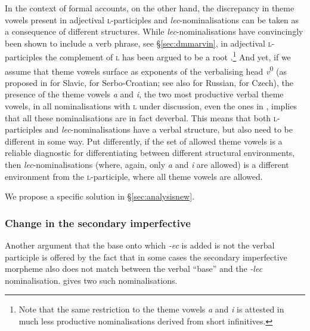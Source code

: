 \documentclass[output=paper,colorlinks,citecolor=brown]{langscibook}
\begin{document}
In the context of formal accounts, on the other hand, the discrepancy in theme vowels present in adjectival \textsc{l}-participles and \textit{lec}-nominalisations can be taken as a consequence of different structures. While \textit{lec}-nominalisations have convincingly been shown to include a verb phrase, see \S \ref{sec:dmmarvin}, in adjectival \textsc{l}-participles the complement of  \textsc{l} has been argued to be a root \citep{simonovicMismas2022}.\footnote{Note that the same restriction to the theme vowels \textit{a} and \textit{i} is attested in much less productive nominalisations derived from short infinitives.}  And yet, if we assume that theme vowels surface as exponents of the verbalising head \textit{v}\textsuperscript{0} (as proposed in \citealt{Quaglia2022} for Slavic, \citealt{MilosArsen2022} for Serbo-Croatian; see also \citealt{Svenonius2004a} for Russian, \citealt{sim+:Biskup2019} for Czech), the presence of the theme vowels \textit{a} and \textit{i}, the two most productive verbal theme vowels, in all nominalisations with \textsc{l} under discussion, even the ones in , implies that all these nominalisations are in fact deverbal.
This means that both \textsc{l}-participles and \textit{lec}-nominalisations have a verbal structure, but also need to be different in some way. Put differently, if the set of allowed theme vowels is a reliable diagnostic for differentiating between different structural environments, then \textit{lec}-nominalisations (where, again, only \textit{a} and \textit{i} are allowed) is a different environment from the \textsc{l}-participle, where all theme vowels are allowed.

We propose a specific solution in \S \ref{sec:analysisnew}.




\subsubsection{Change in the secondary imperfective}

Another argument that the base onto which \textit{-ec} is added is not the verbal participle is offered by the fact that in some cases the secondary imperfective morpheme also does not match between the verbal ``base'' and the \textit{-lec} nominalisation.  gives two such nominalisations.
\end{document}
